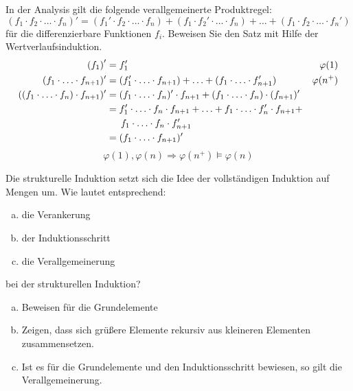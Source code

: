 \begin{card}
  In der Analysis gilt die folgende verallgemeinerte Produktregel:
  \[
  (f_1 \cdot f_2 \cdot \ldots \cdot f_n)' = (f_1' \cdot f_2 \cdot \ldots \cdot f_n) + (f_1 \cdot f_2' \cdot \ldots \cdot f_n) + \ldots + (f_1 \cdot f_2 \cdot \ldots \cdot f_n')
  \]
  für die differenzierbare Funktionen $f_i$. Beweisen Sie den Satz mit Hilfe der Wertverlaufsinduktion.
  \hr
  \begin{align*}
    \left( f_1 \right) ' &= f_1' & \varphi(1) \\
    (f_1 \cdot \ldots \cdot f_{n+1})' &= (f_1' \cdot \ldots \cdot f_{n+1}) + \ldots + (f_1 \cdot \ldots \cdot f_{n+1}') & \varphi(n^+) \\
    ((f_1 \cdot \ldots \cdot f_n) \cdot f_{n+1})'
    &= (f_1 \cdot \ldots \cdot f_n)' \cdot f_{n+1} + (f_1 \cdot \ldots \cdot f_n) \cdot (f_{n+1})' \\
    &= f_1' \cdot \ldots \cdot f_n \cdot f_{n+1} + \ldots + f_1 \cdot \ldots \cdot f_n' \cdot f_{n+1} + \\
    &\hspace{1.5em} f_1 \cdot \ldots \cdot f_n \cdot f_{n+1}' \\
    &= (f_1 \cdot \ldots \cdot f_{n+1})' \\
  \end{align*}
  \[ \varphi(1), \varphi(n) \Rightarrow \varphi(n^+) \vDash \varphi(n) \]
\end{card}

\begin{card}
	Die strukturelle Induktion setzt sich die Idee der vollständigen Induktion auf Mengen um. Wie lautet entsprechend:
  \begin{enumerate}[a)]
	  \item die Verankerung
	  \item der Induktionsschritt
	  \item die Verallgemeinerung
	\end{enumerate}
	bei der strukturellen Induktion?
	\hr
  \begin{enumerate}[a)]
	  \item Beweisen für die Grundelemente
	  \item Zeigen, dass sich grüßere Elemente rekursiv aus kleineren Elementen zusammensetzen.
	  \item Ist es für die Grundelemente und den Induktionsschritt bewiesen, so gilt die Verallgemeinerung.
	\end{enumerate}
\end{card}

